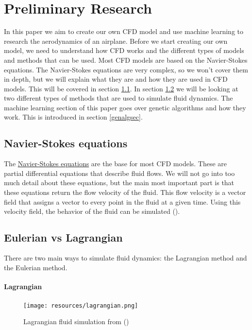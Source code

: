 \documentclass[a4paper,12pt,titlepage]{article}
\begin{document}
\pagebreak

\section{Preliminary Research}
In this paper we aim to create our own CFD model and use machine learning to
research the aerodynamics of an airplane. Before we start creating our own model,
we need to understand how CFD works and the different types of models and methods
that can be used. Most CFD models are based on the Navier-Stokes equations.
The Navier-Stokes equations are very complex, so we won't cover them in depth,
but we will explain what they are and how they are used in CFD models.
This will be covered in section \ref{navierstokes}. In section \ref{eulerianlagrangian}
we will be looking at two different types of methods that are used to simulate
fluid dynamics. The machine learning section of this paper goes over genetic algorithms
and how they work. This is introduced in section \ref{genalgsec}.

\subsection{Navier-Stokes equations} \label{navierstokes}
The \href{https://en.wikipedia.org/wiki/Navier%E2%80%93Stokes_equations}{Navier-Stokes equations}
	are the base for most CFD models. These are partial differential equations
	that describe fluid flows. We will not go into too much detail about these
	equations, but the main most important part is that these equations return
	the flow velocity of the fluid. This flow velocity is a vector field that
	assigns a vector to every point in the fluid at a given time. Using this
	velocity field, the behavior of the fluid can be simulated (\cite{navierstokes}).

\subsection{Eulerian vs Lagrangian} \label{eulerianlagrangian}
There are two main ways to simulate fluid dynamics: the Lagrangian method and the Eulerian method.

\paragraph{Lagrangian}\mbox{}

\begin{figure}[H]
	\centering
	\texttt{[image: resources/lagrangian.png]}
	\caption{Lagrangian fluid simulation from (\cite{seblague})}
\end{figure}
\end{document}
